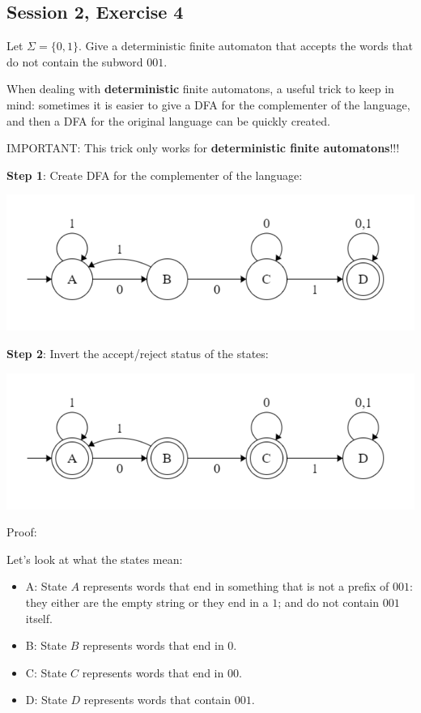 \subsection{Session 2, Exercise 4}


Let $\Sigma=\{0,1\}$. Give a deterministic finite automaton that accepts the words that do not contain the subword $001$.


When dealing with \textbf{deterministic} finite automatons, a useful trick to keep in mind: sometimes it is easier to give a DFA for the complementer of the language, and then a DFA for the original language can be quickly created.

IMPORTANT: This trick only works for \textbf{deterministic finite automatons}!!!

\textbf{Step 1}: Create DFA for the complementer of the language:

\includegraphics[width=0.6\linewidth]{02/2_4.png}

\textbf{Step 2}: Invert the accept/reject status of the states:

\includegraphics[width=0.6\linewidth]{02/2_4_inv.png}

Proof:

Let's look at what the states mean:

\begin{itemize}
    \item A: State $A$ represents words that end in something that is not a prefix of $001$: they either are the empty string or they end in a $1$; and do not contain $001$ itself.
    \item B: State $B$ represents words that end in $0$.
    \item C: State $C$ represents words that end in $00$.
    \item D: State $D$ represents words that contain $001$.
\end{itemize}

